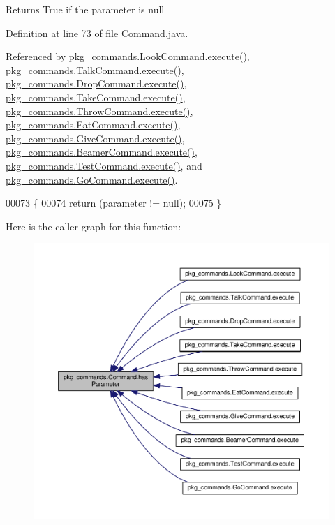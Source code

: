 \begin{DoxyReturn}{Returns}
True if the parameter is null 
\end{DoxyReturn}


Definition at line \hyperlink{Command_8java_source_l00073}{73} of file \hyperlink{Command_8java_source}{Command.\-java}.



Referenced by \hyperlink{LookCommand_8java_source_l00026}{pkg\-\_\-commands.\-Look\-Command.\-execute()}, \hyperlink{TalkCommand_8java_source_l00027}{pkg\-\_\-commands.\-Talk\-Command.\-execute()}, \hyperlink{DropCommand_8java_source_l00027}{pkg\-\_\-commands.\-Drop\-Command.\-execute()}, \hyperlink{TakeCommand_8java_source_l00027}{pkg\-\_\-commands.\-Take\-Command.\-execute()}, \hyperlink{ThrowCommand_8java_source_l00028}{pkg\-\_\-commands.\-Throw\-Command.\-execute()}, \hyperlink{EatCommand_8java_source_l00028}{pkg\-\_\-commands.\-Eat\-Command.\-execute()}, \hyperlink{GiveCommand_8java_source_l00029}{pkg\-\_\-commands.\-Give\-Command.\-execute()}, \hyperlink{BeamerCommand_8java_source_l00030}{pkg\-\_\-commands.\-Beamer\-Command.\-execute()}, \hyperlink{TestCommand_8java_source_l00032}{pkg\-\_\-commands.\-Test\-Command.\-execute()}, and \hyperlink{GoCommand_8java_source_l00032}{pkg\-\_\-commands.\-Go\-Command.\-execute()}.


\begin{DoxyCode}
00073                                   \{
00074         \textcolor{keywordflow}{return} (parameter != null);
00075     \}
\end{DoxyCode}


Here is the caller graph for this function\-:
\nopagebreak
\begin{figure}[H]
\begin{center}
\leavevmode
\includegraphics[width=350pt]{classpkg__commands_1_1Command_a02af95ab3f1898a66259ab7c177b6998_icgraph}
\end{center}
\end{figure}


